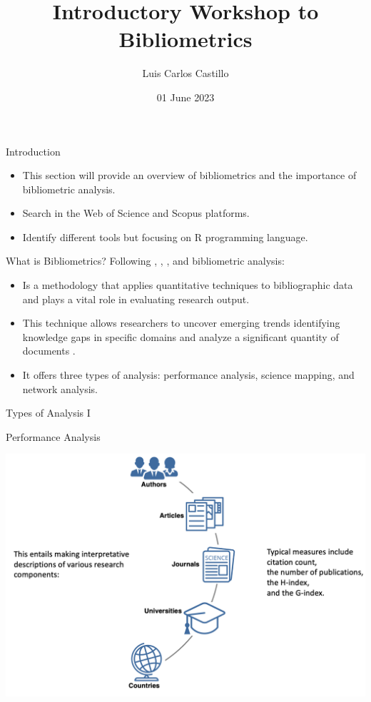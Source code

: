 \documentclass[
  ignorenonframetext,
]{beamer}
\title{Introductory Workshop to Bibliometrics}
\author{Luis Carlos Castillo}
\date{01 June 2023}
\institute{University of Urbino\\
Ph.D.~Program in Global Studies}
\providecommand{\tightlist}{%
  \setlength{\itemsep}{0pt}\setlength{\parskip}{0pt}}
\begin{document}
\frame{\titlepage}

\begin{frame}{Introduction}
\protect\hypertarget{introduction}{}
\begin{itemize}
\item
  This section will provide an overview of bibliometrics and the
  importance of bibliometric analysis.
\item
  Search in the Web of Science and Scopus platforms.
\item
  Identify different tools but focusing on R programming language.
\end{itemize}
\end{frame}

\begin{frame}{What is Bibliometrics?}
\protect\hypertarget{what-is-bibliometrics}{}
Following \citet{donthu2021}, \citet{ellegaard2015}, \citet{Aria2017},
and \citet{bornmann2015} bibliometric analysis:

\begin{itemize}
\tightlist
\item
  Is a methodology that applies quantitative techniques to bibliographic
  data and plays a vital role in evaluating research output.
\item
  This technique allows researchers to uncover emerging trends
  identifying knowledge gaps in specific domains and analyze a
  significant quantity of documents .
\item
  It offers three types of analysis: performance analysis, science
  mapping, and network analysis.
\end{itemize}
\end{frame}

\begin{frame}{Types of Analysis I}
\protect\hypertarget{types-of-analysis-i}{}
\begin{block}{Performance Analysis}
\protect\hypertarget{performance-analysis}{}
\begin{center}
\includegraphics[width=1\textwidth]{pic_1.png}
\end{center}
\end{block}
\end{frame}
\end{document}
